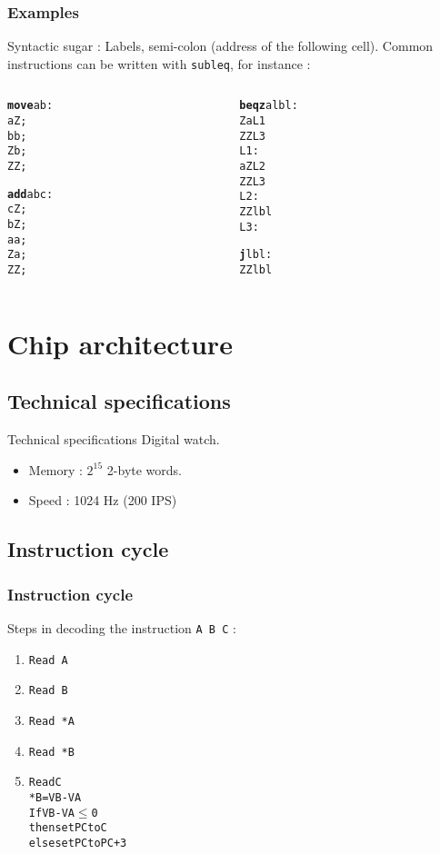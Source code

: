 \documentclass{beamer}
\begin{document}
\begin{frame}[fragile]
    \frametitle{Examples}
Syntactic sugar : Labels, semi-colon (address of the following cell).
Common instructions can be written with \texttt{subleq}, for instance :

\begin{columns}[t]
  \begin{column}[T]{3cm}
    \begin{alltt}
{\bf move} a b :
   a Z ;
   b b ;
   Z b ;
   Z Z ;

{\bf add} a b c :
   c Z ;
   b Z ;
   a a ;
   Z a ;
   Z Z ;
    \end{alltt}
  \end{column}
  \begin{column}[T]{3cm}
    \begin{alltt}
{\bf beqz} a lbl :
    Z a L1
    Z Z L3
 L1:
    a Z L2
    Z Z L3
 L2:
    Z Z lbl
 L3:

{\bf j} lbl :
    Z Z lbl
    \end{alltt}
  \end{column}
  \end{columns}
\end{frame}


\section{Chip architecture}
\subsection{Technical specifications}

\begin{frame}{Technical specifications}
  Digital watch.
  \begin{itemize}
    \item Memory : $2^{15}$ 2-byte words.
    \item Speed : 1024 Hz (200 IPS)
  \end{itemize}
\end{frame}

\subsection{Instruction cycle}

\begin{frame}[fragile]
  \frametitle{Instruction cycle}
  Steps in decoding the instruction \verb=A B C= :
      \begin{enumerate}
        \item<2-> \verb=Read A=
        \item<3-> \verb=Read B=
        \item<4-> \verb=Read *A=
        \item<5-> \verb=Read *B=
        \item<6->
          \begin{alltt}
Read C
*B = VB - VA
If VB - VA \(\leq\) 0
  then set PC to C
else set PC to PC+3
          \end{alltt}
      \end{enumerate}
\end{frame}
\end{document}
